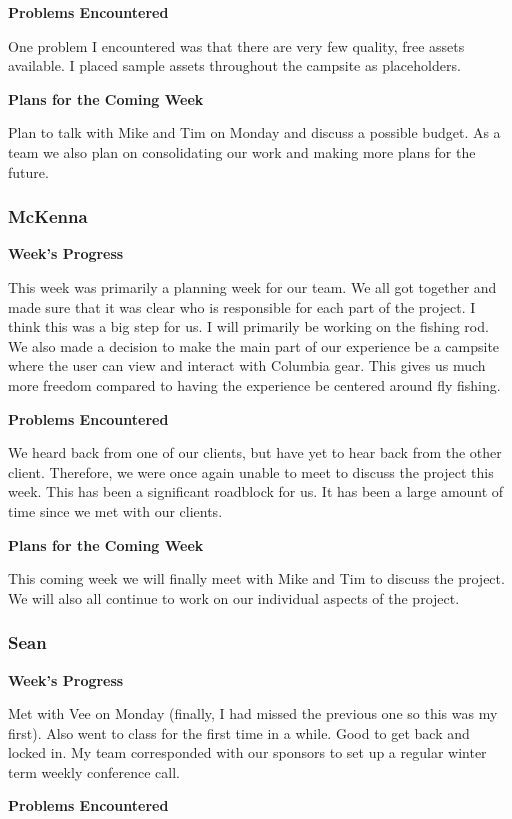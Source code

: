 \documentclass[10pt,journal,compsoc,onecolumn, draftclsnofoot]{IEEEtran}
\begin{document}
\noindent \textbf{Problems Encountered}

One problem I encountered was that there are very few quality, free assets available. I placed sample assets throughout the campsite as placeholders.

\noindent \textbf{Plans for the Coming Week}

Plan to talk with Mike and Tim on Monday and discuss a possible budget. As a team we also plan on consolidating our work and making more plans for the future.

\subsubsection{McKenna}
\noindent \textbf{Week's Progress}

This week was primarily a planning week for our team. We all got together and made sure that it was clear who is responsible for each part of the project. I think this was a big step for us. I will primarily be working on the fishing rod. We also made a decision to make the main part of our experience be a campsite where the user can view and interact with Columbia gear. This gives us much more freedom compared to having the experience be centered around fly fishing.

\noindent \textbf{Problems Encountered}

We heard back from one of our clients, but have yet to hear back from the other client. Therefore, we were once again unable to meet to discuss the project this week. This has been a significant roadblock for us. It has been a large amount of time since we met with our clients.

\noindent \textbf{Plans for the Coming Week}

This coming week we will finally meet with Mike and Tim to discuss the project. We will also all continue to work on our individual aspects of the project.

\subsubsection{Sean}
\noindent \textbf{Week's Progress}

Met with Vee on Monday (finally, I had missed the previous one so this was my first). Also went to class for the first time in a while. Good to get back and locked in. My team corresponded with our sponsors to set up a regular winter term weekly conference call.

\noindent \textbf{Problems Encountered}
\end{document}
